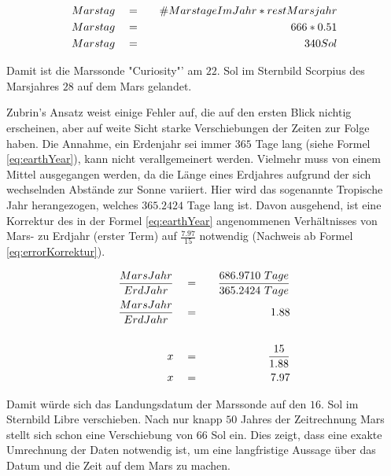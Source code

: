 \begin{eqnarray}
	Marstag \quad & = & \quad \#MarstageImJahr * restMarsjahr \\
	Marstag \quad & = & \quad 666 * 0.51 \notag\\
	Marstag \quad & = & \quad 340 Sol \notag
	\label{eq:MarsMonthSol}
\end{eqnarray}

Damit ist die Marssonde "Curiosity"' am $22.$ Sol im Sternbild Scorpius des 
Marsjahres $28$ auf dem Mars gelandet.

Zubrin's Ansatz weist einige Fehler auf, die auf den ersten Blick nichtig
erscheinen, aber auf weite Sicht starke Verschiebungen der Zeiten zur Folge
haben. Die Annahme, ein Erdenjahr sei immer $365$ Tage lang (siehe Formel
\ref{eq:earthYear}), kann nicht verallgemeinert werden. Vielmehr muss von einem
Mittel ausgegangen werden, da die Länge eines Erdjahres aufgrund der sich
wechselnden Abstände zur Sonne variiert. Hier wird das sogenannte Tropische Jahr
herangezogen, welches $365.2424$ Tage lang ist. Davon ausgehend, ist eine
Korrektur des in der Formel \ref{eq:earthYear} angenommenen Verhältnisses von
Mars- zu Erdjahr (erster Term) auf $\frac{7.97}{15}$ notwendig (Nachweis ab
Formel \ref{eq:errorKorrektur}). 

\begin{eqnarray}
	\frac{MarsJahr}{ErdJahr} \quad & = & \quad \frac{686.9710 \ Tage}{365.2424 \ Tage}
	\\
	\label{eq:errorKorrektur}  
	\frac{MarsJahr}{ErdJahr} \quad & = & \quad 1.88 \notag\\
	\notag\\
	x \quad & = & \quad \frac{15}{1.88} \notag\\
	x \quad & = & \quad 7.97 \notag
\end{eqnarray}

Damit würde sich das Landungsdatum der Marssonde auf den $16.$ Sol im Sternbild
Libre verschieben. Nach nur knapp $50$ Jahres der Zeitrechnung Mars stellt sich
schon eine Verschiebung von $66$ Sol ein. Dies zeigt, dass eine exakte
Umrechnung der Daten notwendig ist, um eine langfristige Aussage über das Datum und
die Zeit auf dem Mars zu machen. 
